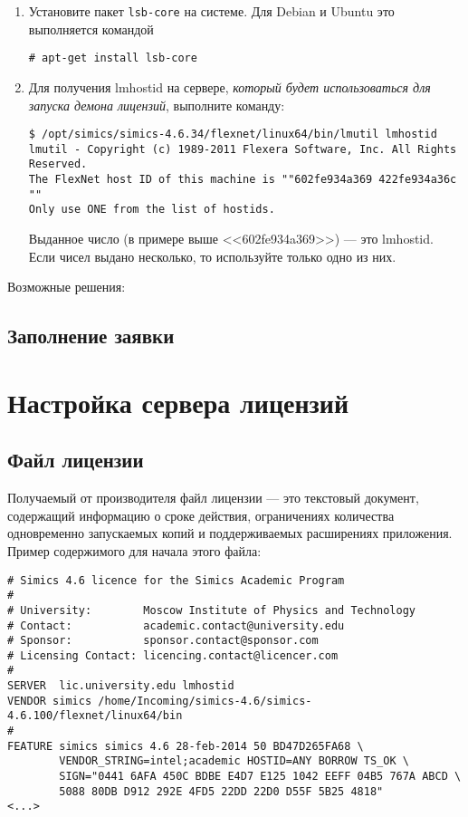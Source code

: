 \begin{enumerate}
    \item Установите пакет \texttt{lsb-core} на системе. Для Debian и Ubuntu это выполняется командой 
    
    \texttt{\# apt-get install lsb-core}
         
    \item Для получения lmhostid на сервере, \textit{который будет использоваться для запуска демона лицензий}, выполните команду:
    
\begin{lstlisting}
$ /opt/simics/simics-4.6.34/flexnet/linux64/bin/lmutil lmhostid
lmutil - Copyright (c) 1989-2011 Flexera Software, Inc. All Rights Reserved.
The FlexNet host ID of this machine is ""602fe934a369 422fe934a36c ""
Only use ONE from the list of hostids.
\end{lstlisting}

Выданное число (в примере выше <<602fe934a369>>) --- это lmhostid. Если чисел выдано несколько, то используйте только одно из них.
    
\end{enumerate}


Возможные решения:




\subsection{Заполнение заявки}




\section{Настройка сервера лицензий}


\subsection{Файл лицензии}

Получаемый от производителя файл лицензии --- это текстовый документ, содержащий информацию о сроке действия, ограничениях количества одновременно запускаемых копий и поддерживаемых расширениях приложения. Пример содержимого для начала этого файла:

\begin{lstlisting}
# Simics 4.6 licence for the Simics Academic Program
#
# University:        Moscow Institute of Physics and Technology
# Contact:           academic.contact@university.edu
# Sponsor:           sponsor.contact@sponsor.com
# Licensing Contact: licencing.contact@licencer.com
#
SERVER  lic.university.edu lmhostid
VENDOR simics /home/Incoming/simics-4.6/simics-4.6.100/flexnet/linux64/bin
#
FEATURE simics simics 4.6 28-feb-2014 50 BD47D265FA68 \
        VENDOR_STRING=intel;academic HOSTID=ANY BORROW TS_OK \
        SIGN="0441 6AFA 450C BDBE E4D7 E125 1042 EEFF 04B5 767A ABCD \
        5088 80DB D912 292E 4FD5 22DD 22D0 D55F 5B25 4818"
<...>
\end{lstlisting}

